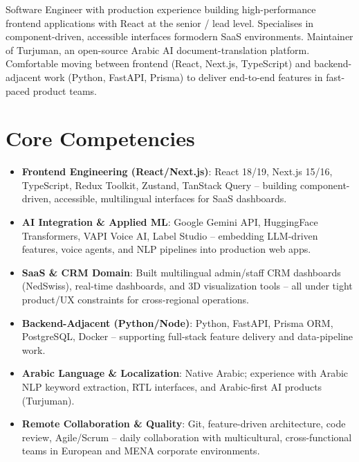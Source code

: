 \documentclass[11pt,a4paper,sans]{moderncv}
\begin{document}
\makecvtitle

\vspace{6pt}
\small{Software Engineer with production experience building high-performance frontend applications with React at the senior / lead level. Specialises in component-driven, accessible interfaces formodern SaaS environments. Maintainer of Turjuman, an open-source Arabic AI document-translation platform. Comfortable moving between frontend (React, Next.js, TypeScript) and backend-adjacent work (Python, FastAPI, Prisma) to deliver end-to-end features in fast-paced product teams.}

\section{Core Competencies}
\vspace{1pt}
\begin{itemize}

\item \textbf{Frontend Engineering (React/Next.js)}: React 18/19, Next.js 15/16, TypeScript, Redux Toolkit, Zustand, TanStack Query -- building component-driven, accessible, multilingual interfaces for SaaS dashboards.

\item \textbf{AI Integration \& Applied ML}: Google Gemini API, HuggingFace Transformers, VAPI Voice AI, Label Studio -- embedding LLM-driven features, voice agents, and NLP pipelines into production web apps.

\item \textbf{SaaS \& CRM Domain}: Built multilingual admin/staff CRM dashboards (NedSwiss), real-time dashboards, and 3D visualization tools -- all under tight product/UX constraints for cross-regional operations.

\item \textbf{Backend-Adjacent (Python/Node)}: Python, FastAPI, Prisma ORM, PostgreSQL, Docker -- supporting full-stack feature delivery and data-pipeline work.

\item \textbf{Arabic Language \& Localization}: Native Arabic; experience with Arabic NLP keyword extraction, RTL interfaces, and Arabic-first AI products (Turjuman).

\item \textbf{Remote Collaboration \& Quality}: Git, feature-driven architecture, code review, Agile/Scrum -- daily collaboration with multicultural, cross-functional teams in European and MENA corporate environments.

\end{itemize}
\end{document}
